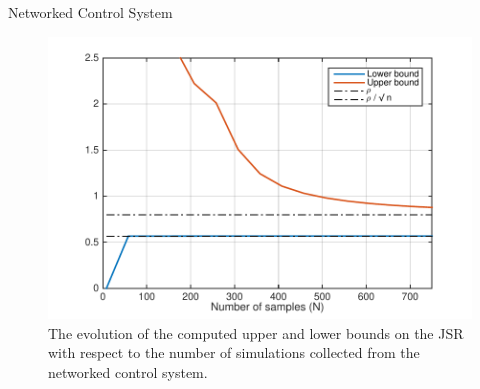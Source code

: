 \begin{subsection}{Networked Control System}
\begin{figure}
    \centering
        \includegraphics[scale=0.7]{networkControl.pdf}
    \caption{The evolution of the computed upper and lower bounds on the JSR with respect to the number of simulations collected from the networked control system.}
        \label{fig:4}
\end{figure}

\end{subsection}